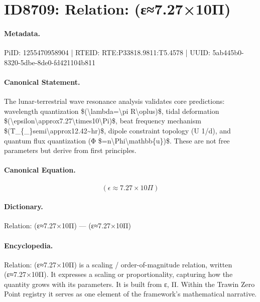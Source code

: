 \section*{ID8709: Relation: (ε≈7.27×10Π)}
\paragraph{Metadata.}
PiID: 1255470958904 | RTEID: RTE:P33818.9811:T5.4578 | UUID: 5ab445b0-8320-5dbe-8de0-fd421104b811

\paragraph{Canonical Statement.}
The lunar-terrestrial wave resonance analysis validates core predictions: wavelength quantization \$(\textbackslash{}lambda=\textbackslash{}pi R\textbackslash{}oplus)\$, tidal deformation \$(\textbackslash{}epsilon\textbackslash{}approx7.27\textbackslash{}times10\textbackslash{}Pi)\$, beat frequency mechanism \$(T\_\{\_\}semi\textbackslash{}approx12.42\textasciitilde{}hr)\$, dipole constraint topology (U 1/d), and quantum flux quantization (Φ \$=n\textbackslash{}Phi\textbackslash{}mathbb\{u\})\$. These are not free parameters but derive from first principles.

\paragraph{Canonical Equation.}
\[
(\epsilon\approx7.27\times10\Pi)
\]

\paragraph{Dictionary.}
Relation: (ε≈7.27×10Π) — (ε≈7.27×10Π)

\paragraph{Encyclopedia.}
Relation: (ε≈7.27×10Π) is a scaling / order-of-magnitude relation, written (ε≈7.27×10Π). It expresses a scaling or proportionality, capturing how the quantity grows with its parameters. It is built from ε, Π. Within the Trawin Zero Point registry it serves as one element of the framework's mathematical narrative.
